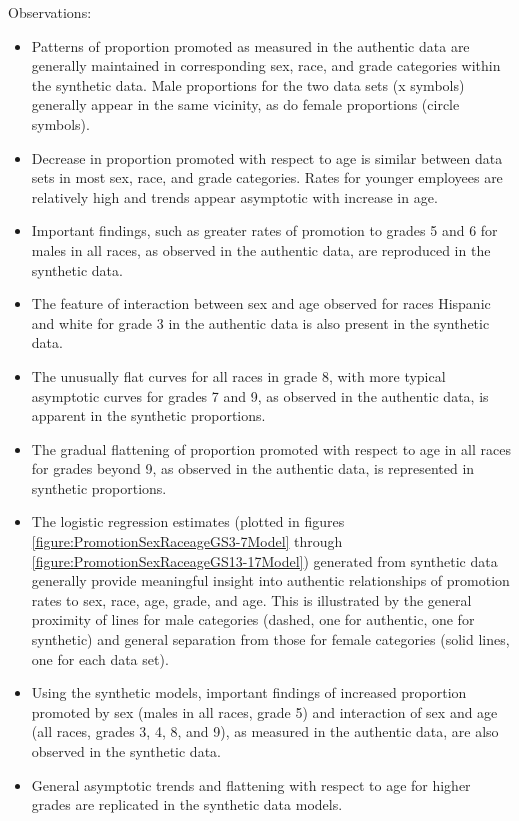 \documentclass[10pt, letterpaper]{article}
\begin{document}
\begin{spacing}{1.0}
Observations:
\begin{itemize}
    \item Patterns of proportion promoted as measured in the authentic data are generally maintained in corresponding sex, race, and grade categories within the synthetic data.  Male proportions for the two data sets (x symbols) generally appear in the same vicinity, as do female proportions (circle symbols).
    \item Decrease in proportion promoted with respect to age is similar between data sets in most sex, race, and grade categories.  Rates for younger employees are relatively high and trends appear asymptotic with increase in age.
    \item Important findings, such as greater rates of promotion to grades 5 and 6 for males in all races, as observed in the authentic data, are reproduced in the synthetic data.
    \item The feature of interaction between sex and age observed for races Hispanic and white for grade 3 in the authentic data is also present in the synthetic data.
    \item The unusually flat curves for all races in grade 8, with more typical asymptotic curves for grades 7 and 9, as observed in the authentic data, is apparent in the synthetic proportions.
    \item The gradual flattening of proportion promoted with respect to age in all races for grades beyond 9, as observed in the authentic data, is represented in synthetic proportions.
    \item The logistic regression estimates (plotted in figures \ref{figure:PromotionSexRaceageGS3-7Model} through \ref{figure:PromotionSexRaceageGS13-17Model}) generated from synthetic data generally provide meaningful insight into authentic relationships of promotion rates to sex, race, age, grade, and age.  This is illustrated by the general proximity of lines for male categories (dashed, one for authentic, one for synthetic) and general separation from those for female categories (solid lines, one for each data set).
    \item Using the synthetic models, important findings of increased proportion promoted by sex (males in all races, grade 5) and interaction of sex and age (all races, grades 3, 4, 8, and 9), as measured in the authentic data, are also observed in the synthetic data.
    \item General asymptotic trends and flattening with respect to age for higher grades are replicated in the synthetic data models.
    

\end{itemize}
\end{spacing}
\end{document}
